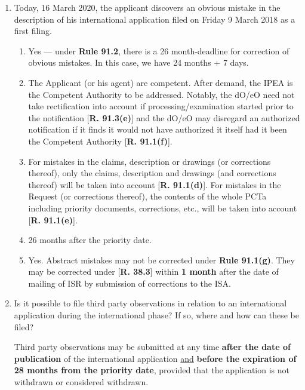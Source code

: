 \documentclass{report}
\begin{document}
\begin{enumerate}[label=\textbf{Answer \arabic*}]
    \item %
    Today, 16 March 2020, the applicant discovers an obvious mistake in the description of his international application filed on Friday 9 March 2018 as a first filing.
    \begin{enumerate}[label=(\alph*)]
        \item Yes --- under \textbf{Rule 91.2}, there is a 26 month-deadline for correction of obvious mistakes. In this case, we have 24 months + 7 days.
        \item The Applicant (or his agent) are competent. After demand, the IPEA is the Competent Authority to be addressed. Notably, the dO/eO need not take rectification into account if processing/examination started prior to the notification [\textbf{R. 91.3(e)}] and the dO/eO may disregard an authorized notification if it finds it would not have authorized it itself had it been the Competent Authority [\textbf{R. 91.1(f)}].
        \item For mistakes in the claims, description or drawings (or corrections thereof), only the claims, description and drawings (and corrections thereof) will be taken into account [\textbf{R. 91.1(d)}]. 
        For mistakes in the Request (or corrections thereof), the contents of the whole PCTa including priority documents, corrections, etc., will be taken into account [\textbf{R. 91.1(e)}].
        \item 26 months after the priority date.
        \item Yes. Abstract mistakes may not be corrected under \textbf{Rule 91.1(g)}. They may be corrected under [\textbf{R. 38.3}] within \textbf{1 month} after the date of mailing of ISR by submission of corrections to the ISA.
    \end{enumerate}

    \item %
    Is it possible to file third party observations in relation to an international application during the international phase? If so, where and how can these be filed?


      Third party observations may be submitted at any time \textbf{after the date of publication} of the international application \underline{and} \textbf{before the expiration of 28 months from the priority date}, provided that the application is not withdrawn or considered withdrawn.
      

\end{enumerate}
\end{document}
